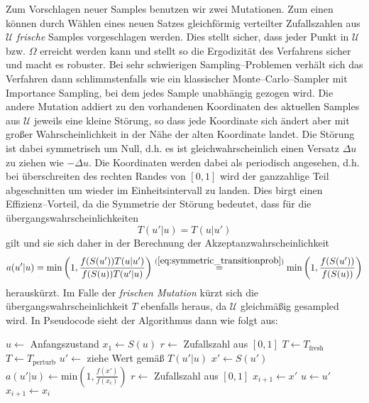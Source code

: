 	Zum Vorschlagen neuer Samples benutzen wir zwei Mutationen. Zum einen können durch Wählen eines neuen Satzes gleichförmig verteilter Zufallszahlen aus $\mathcal{U}$ {\em frische} Samples vorgeschlagen werden. Dies stellt sicher, dass jeder Punkt in $\mathcal{U}$ bzw. $\Omega$ erreicht werden kann und stellt so die Ergodizität des Verfahrens sicher und macht es robuster. Bei sehr schwierigen Sampling--Problemen verhält sich das Verfahren dann schlimmstenfalls wie ein klassischer Monte--Carlo--Sampler mit Importance Sampling, bei dem jedes Sample unabhängig gezogen wird.
	Die andere Mutation addiert zu den vorhandenen Koordinaten des aktuellen Samples aus $\mathcal{U}$ jeweils eine kleine Störung, so dass jede Koordinate sich ändert aber mit großer Wahrscheinlichkeit in der Nähe der alten Koordinate landet. Die Störung ist dabei symmetrisch um Null, d.h. es ist gleichwahrscheinlich einen Versatz $\Delta u$ zu ziehen wie $-\Delta u$. Die Koordinaten werden dabei als periodisch angesehen, d.h. bei überschreiten des rechten Randes von $[0,1]$ wird der ganzzahlige Teil abgeschnitten um wieder im Einheitsintervall zu landen. Dies birgt einen Effizienz--Vorteil, da die Symmetrie der Störung bedeutet, dass für die übergangswahrscheinlichkeiten
	\begin{equation}
	  T(u'|u)=T(u|u')
	  \label{eq:symmetric_transitionprob}
	\end{equation}
	gilt und sie sich daher in der Berechnung der Akzeptanzwahrscheinlichkeit
	$$a(u'|u)=\text{min}\left(1,\frac{f(S(u'))T(u|u')}{f(S(u))T(u'|u)}\right)\stackrel{(\ref{eq:symmetric_transitionprob})}{=}\text{min}\left(1,\frac{f(S(u'))}{f(S(u))}\right)$$
	herauskürzt. Im Falle der {\em frischen Mutation} kürzt sich die übergangswahrscheinlichkeit $T$ ebenfalls heraus, da $\mathcal{U}$ gleichmäßig gesampled wird.
	In Pseudocode sieht der Algorithmus dann wie folgt aus:
	\begin{algorithmic}
		\STATE $u \leftarrow$ Anfangszustand
		\STATE $x_1 \leftarrow S(u)$
			\STATE $r\leftarrow$ Zufallszahl aus $[0,1]$
						\STATE $T \leftarrow T_\text{fresh}$
				\STATE $T \leftarrow T_\text{perturb}$
			\ENDIF
			\STATE $u'\leftarrow$ ziehe Wert gemäß $T(u'|u)$
			\STATE $x' \leftarrow S(u')$
			\STATE $a(u'|u) \leftarrow \text{min}\left(1,\frac{f(x')}{f(x_i)}\right)$
			\STATE $r\leftarrow$ Zufallszahl aus $[0,1]$
			  \STATE $x_{i+1} \leftarrow x'$
			  \STATE $u \leftarrow u'$
			\ELSE	\STATE $x_{i+1} \leftarrow x_i$
			\ENDIF
	  \ENDFOR
	\end{algorithmic}

